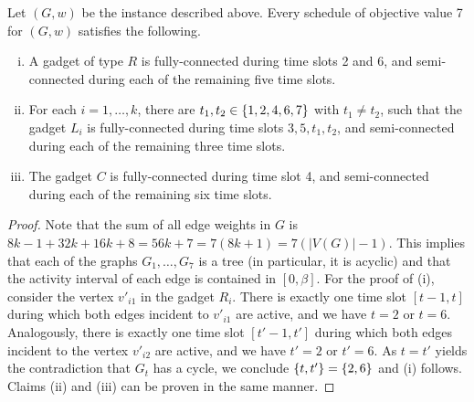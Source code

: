 \begin{lemma}
\label{lemma:gadgets_properties}
Let $(G,w)$ be the instance described above. 
Every schedule of objective value 7 for $(G, w)$ satisfies the following.
\begin{enumerate}[(i)]
\item A gadget of type $R$ is fully-connected during time slots 2 and 6, and 
semi-connected during each of the remaining five time slots.
\item For each $i=1,\dots,k$, there are $t_1,t_2 \in \{ 1,2,4,6,7 \}$ with $t_1\ne t_2$, such that the gadget $L_i$ is fully-connected during time slots $3,5,t_1, t_2$, 
and semi-connected during each of the remaining three time slots.
\item The gadget $C$ is fully-connected during time slot 4, 
and semi-connected during each of the remaining six time slots.
\end{enumerate}
\end{lemma}
\begin{proof}
Note that the sum of all edge weights in $G$ is $8k-1 +32k +16k +8 = 56k+7 = 7(8k + 1) = 7(|V(G)|-1)$. 
This implies that each of the graphs $G_1,\ldots,G_7$ is a tree (in particular, it is acyclic) and that the activity interval of each edge is contained in $[0, \beta]$.
For the proof of (i), consider the vertex $v'_{i1}$ in the gadget $R_i$. 
There is exactly one time slot $[t-1, t]$ during which both edges incident to $v'_{i1}$ are active, 
and we have $t=2$ or $t=6$. 
Analogously, there is exactly one time slot $[t'-1, t']$ during which both edges incident to 
the vertex $v'_{i2}$ are active, and we have $t' = 2$ or $t' = 6$. 
As $t=t'$ yields the contradiction that $G_t$ has a cycle, we conclude $\{ t,t' \}=\{ 2,6 \}$ and (i) follows. 
Claims (ii) and (iii) can be proven in the same manner. 
\end{proof}

